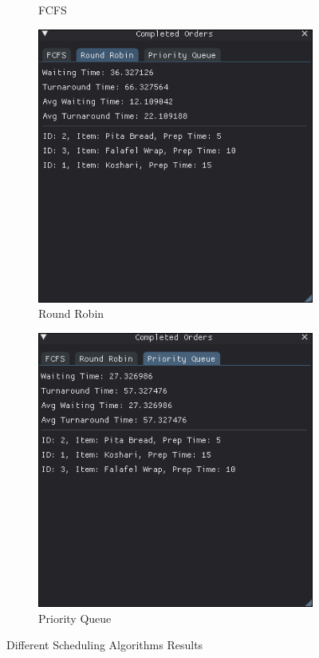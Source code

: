 \documentclass[a4paper,12pt]{article}
\begin{document}
\begin{itemize}
\begin{figure}[H]
\begin{subfigure}[b]{0.32\linewidth}
        \caption{FCFS}
        \label{fig:FCFS}
    \end{subfigure}
    \hfill
    \begin{subfigure}[b]{0.32\linewidth}
        \centering
        \includegraphics[width=\linewidth]{RR.png}
        \caption{Round Robin}
        \label{fig:RR}
    \end{subfigure}
    \hfill
    \begin{subfigure}[b]{0.32\linewidth}
        \centering
        \includegraphics[width=\linewidth]{PQ.png}
        \caption{Priority Queue}
        \label{fig:PQ}
    \end{subfigure}
    \caption{Different Scheduling Algorithms Results}
    \label{fig:gui-all}
\end{figure}
\end{itemize}
\newpage
\end{document}
